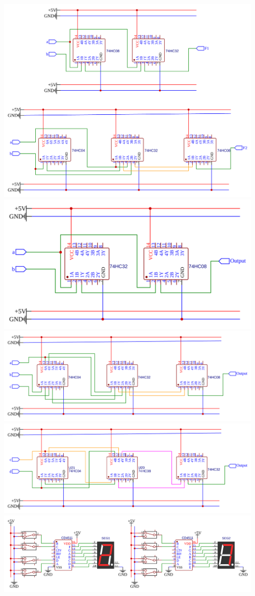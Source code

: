 \documentclass[pdftex,12pt,a4paper]{article}
\begin{document}
\includegraphics[width=\textwidth]{EasyEDA_part_1.png}
\includegraphics[width=\textwidth]{EasyEDA_part_2.png}
\includegraphics[width=\textwidth]{EasyEDA_part_3.png}
\includegraphics[width=\textwidth]{EasyEDA_part_4.png}
\includegraphics[width=\textwidth]{EasyEDA_part_5.png}
\end{document}
